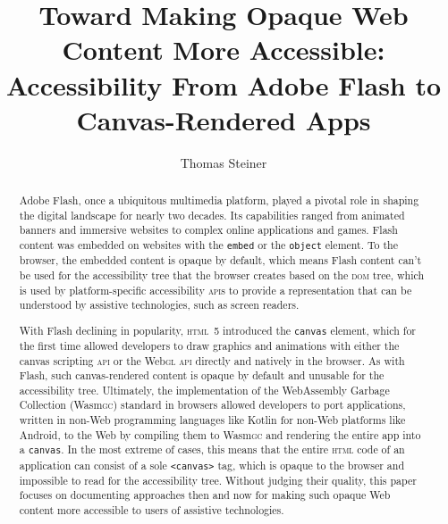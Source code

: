 \documentclass[sigconf]{acmart}
\begin{document}
\title[Toward Making Opaque Web Content More Accessible]{Toward Making Opaque Web Content More Accessible: \protect\\ Accessibility From Adobe Flash to Canvas-Rendered Apps}

\author{Thomas Steiner}


\begin{abstract}
Adobe Flash, once a ubiquitous multimedia platform, played a pivotal role in shaping the digital landscape for nearly two decades. Its capabilities ranged from animated banners and immersive websites to complex online applications and games. Flash content was embedded on websites with the \texttt{embed} or the \texttt{object} element. To the browser, the embedded content is opaque by default, which means Flash content can't be used for the accessibility tree that the browser creates based on the \textsc{dom} tree, which is used by platform-specific accessibility \textsc{api}s to provide a representation that can be understood by assistive technologies, such as screen readers.

With Flash declining in popularity, \textsc{html}\ 5 introduced the \texttt{canvas} element, which for the first time allowed developers to draw graphics and animations with either the canvas scripting \textsc{api} or the Web\textsc{gl} \textsc{api} directly and natively in the browser. As with Flash, such canvas-rendered content is opaque by default and unusable for the accessibility tree. Ultimately, the implementation of the WebAssembly Garbage Collection (Wasm\textsc{gc}) standard in browsers allowed developers to port applications, written in non-Web programming languages like Kotlin for non-Web platforms like Android, to the Web by compiling them to Wasm\textsc{gc} and rendering the entire app into a \texttt{canvas}. In the most extreme of cases, this means that the entire \textsc{html} code of an application can consist of a sole \texttt{<canvas>} tag, which is opaque to the browser and impossible to read for the accessibility tree. Without judging their quality, this paper focuses on documenting approaches then and now for making such opaque Web content more accessible to users of assistive technologies.
\end{abstract}
\end{document}
